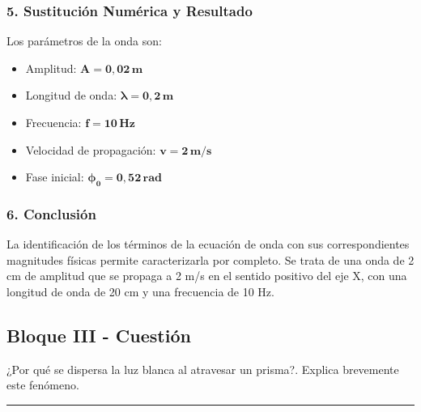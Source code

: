 \subsubsection*{5. Sustitución Numérica y Resultado}
\begin{cajaresultado}
Los parámetros de la onda son:
\begin{itemize}
    \item Amplitud: $\boldsymbol{A = 0,02 \, \textbf{m}}$
    \item Longitud de onda: $\boldsymbol{\lambda = 0,2 \, \textbf{m}}$
    \item Frecuencia: $\boldsymbol{f = 10 \, \textbf{Hz}}$
    \item Velocidad de propagación: $\boldsymbol{v = 2 \, \textbf{m/s}}$
    \item Fase inicial: $\boldsymbol{\phi_0 = 0,52 \, \textbf{rad}}$
\end{itemize}
\end{cajaresultado}

\subsubsection*{6. Conclusión}
\begin{cajaconclusion}
La identificación de los términos de la ecuación de onda con sus correspondientes magnitudes físicas permite caracterizarla por completo. Se trata de una onda de 2 cm de amplitud que se propaga a 2 m/s en el sentido positivo del eje X, con una longitud de onda de 20 cm y una frecuencia de 10 Hz.
\end{cajaconclusion}

\newpage

\subsection{Bloque III - Cuestión}
\label{subsec:B3_2010_sep_ext}

\begin{cajaenunciado}
¿Por qué se dispersa la luz blanca al atravesar un prisma?. Explica brevemente este fenómeno.
\end{cajaenunciado}
\hrule

